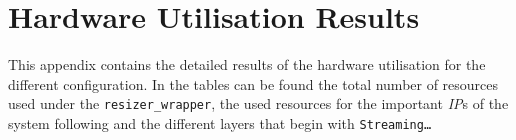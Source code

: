 
\chapter{Hardware Utilisation Results} %

\label{AppendixA} %


This appendix contains the detailed results of the hardware utilisation for the different configuration. In the tables can be found the total number of resources used under the \texttt{resizer\_wrapper}, the used resources for the important \emph{IP}s of the system following and the different layers that begin with \texttt{Streaming\ldots}



